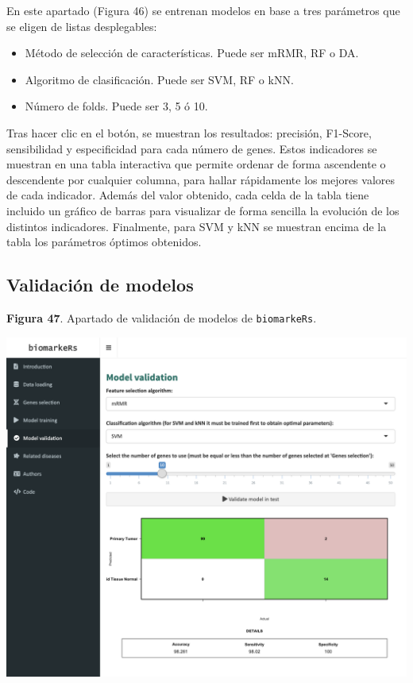 En este apartado (Figura 46) se entrenan modelos en base a tres parámetros que se eligen de listas desplegables:
\begin{itemize}
	\item Método de selección de características. Puede ser mRMR, RF o DA.
	\item Algoritmo de clasificación. Puede ser SVM, RF o kNN.
	\item Número de folds. Puede ser 3, 5 ó 10.
\end{itemize}

Tras hacer clic en el botón, se muestran los resultados: precisión, F1-Score, sensibilidad y especificidad para cada número de genes. Estos indicadores se muestran en una tabla interactiva que permite ordenar de forma ascendente o descendente por cualquier columna, para hallar rápidamente los mejores valores de cada indicador. Además del valor obtenido, cada celda de la tabla tiene incluido un gráfico de barras para visualizar de forma sencilla la evolución de los distintos indicadores. Finalmente, para SVM y kNN se muestran encima de la tabla los parámetros óptimos obtenidos.

\newpage
\subsection{Validación de modelos}

\begin{center}
	\textbf{Figura 47}. Apartado de validación de modelos de \texttt{biomarkeRs}.
\end{center}

\begin{center}
	\includegraphics[width=.90\textwidth]{figuras/47_model_validation.png} \\
\end{center}

